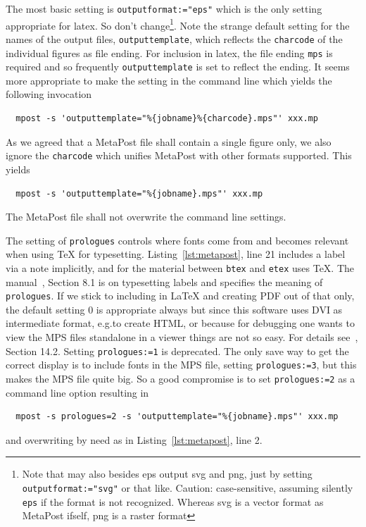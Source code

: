 The most basic setting is \texttt{outputformat:="eps"} %
which is the only setting appropriate for latex. 
So don't change\footnote%
{Note that  may also besides \gls{eps} 
output \gls{svg} and \gls{png}, 
just by setting \texttt{outputformat:="svg"} or that like. %
Caution: case-sensitive, assuming silently \texttt{eps} if the format is not recognized. 
Whereas \gls{svg} is a vector format as MetaPost ifself, \gls{png} is a raster format}. 
Note the strange default setting for the names of the output files, \texttt{outputtemplate}, 
which reflects the \texttt{charcode} of the individual figures as file ending. 
For inclusion in latex, the file ending \texttt{mps} is required 
and so frequently \texttt{outputtemplate} is set to reflect the ending. 
It seems more appropriate to make the setting in the command line 
which yields the following invocation
%
\begin{verbatim}
  mpost -s 'outputtemplate="%{jobname}%{charcode}.mps"' xxx.mp
\end{verbatim}

As we agreed that a MetaPost file shall contain a single figure only, 
we also ignore the \texttt{charcode} which unifies MetaPost with other formats supported. 
This yields 
%
\begin{verbatim}
  mpost -s 'outputtemplate="%{jobname}.mps"' xxx.mp
\end{verbatim}
%
The MetaPost file shall not overwrite the command line settings. 

The setting of \texttt{prologues} controls where fonts come from and 
becomes relevant when using \TeX{} for typesetting. 
Listing~\ref{lst:metapost}, line 21 includes a label via a note implicitly, 
and for the material between \texttt{btex} and \texttt{etex} uses \TeX{}. 
The manual~\cite{MPost24}, Section 8.1 is on typesetting labels 
and specifies the meaning of \texttt{prologues}. 
If we stick to including in \LaTeX{} and creating PDF out of that only, 
the default setting $0$ is appropriate always 
but since this software uses DVI as intermediate format, e.g.\@ to create HTML, 
or because for debugging one wants to view the MPS files standalone in a viewer 
things are not so easy. 
For details see~\cite{MPost24}, Section 14.2. 
Setting \texttt{prologues:=1} is deprecated. 
The only save way to get the correct display is to include fonts in the MPS file, 
setting \texttt{prologues:=3}, but this makes the MPS file quite big. 
So a good compromise is to set \texttt{prologues:=2} as a command line option 
resulting in 
%
\begin{verbatim}
  mpost -s prologues=2 -s 'outputtemplate="%{jobname}.mps"' xxx.mp
\end{verbatim}
%
and overwriting by need as in Listing~\ref{lst:metapost}, line 2. 

